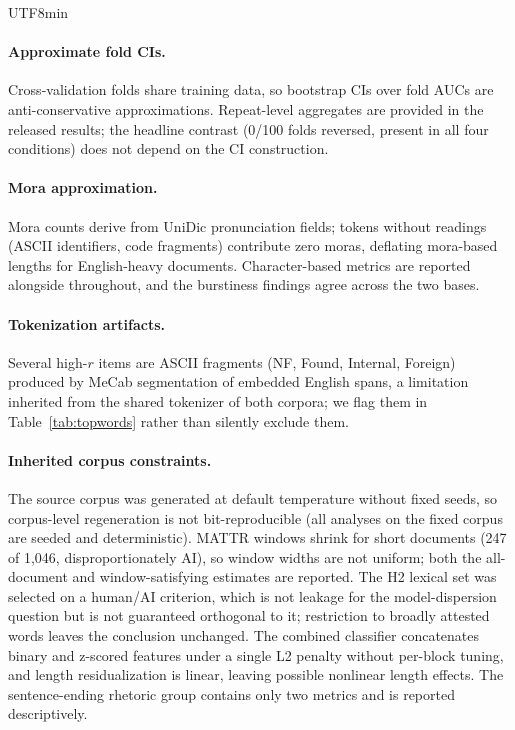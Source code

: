 \documentclass[11pt,a4paper]{article}
\begin{document}
\begin{CJK}{UTF8}{min}
\paragraph{Approximate fold CIs.} Cross-validation folds share training data, so bootstrap CIs over fold AUCs are anti-conservative approximations. Repeat-level aggregates are provided in the released results; the headline contrast (0/100 folds reversed, present in all four conditions) does not depend on the CI construction.

\paragraph{Mora approximation.} Mora counts derive from UniDic pronunciation fields; tokens without readings (ASCII identifiers, code fragments) contribute zero moras, deflating mora-based lengths for English-heavy documents. Character-based metrics are reported alongside throughout, and the burstiness findings agree across the two bases.

\paragraph{Tokenization artifacts.} Several high-$r$ items are ASCII fragments (NF, Found, Internal, Foreign) produced by MeCab segmentation of embedded English spans, a limitation inherited from the shared tokenizer of both corpora; we flag them in Table~\ref{tab:topwords} rather than silently exclude them.

\paragraph{Inherited corpus constraints.} The source corpus was generated at default temperature without fixed seeds, so corpus-level regeneration is not bit-reproducible (all analyses on the fixed corpus are seeded and deterministic). MATTR windows shrink for short documents (247 of 1{,}046, disproportionately AI), so window widths are not uniform; both the all-document and window-satisfying estimates are reported. The H2 lexical set was selected on a human/AI criterion, which is not leakage for the model-dispersion question but is not guaranteed orthogonal to it; restriction to broadly attested words leaves the conclusion unchanged. The combined classifier concatenates binary and z-scored features under a single L2 penalty without per-block tuning, and length residualization is linear, leaving possible nonlinear length effects. The sentence-ending rhetoric group contains only two metrics and is reported descriptively.


\end{CJK}
\end{document}
